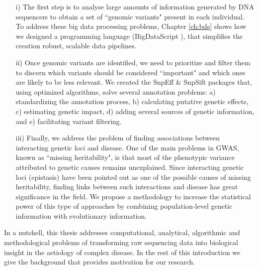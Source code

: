 \begin{itemize}

\item[i)] The first step is to analyse large amounts of information generated by DNA sequencers to obtain a set of ``genomic variants" present in each individual. 
To address these big data processing problems, Chapter \ref{ch:bds} shows how we designed a programming language (BigDataScript \cite{cingolani2015bigdatascript}), that simplifies the creation robust, scalable data pipelines.

\item[ii)] Once genomic variants are identified, we need to prioritize and filter them to discern which variants should be considered ``important" and which ones are likely to be less relevant. We created the SnpEff \& SnpSift \cite{cingolani2012program, cingolani2012using} packages that, using optimized algorithms, solve several annotation problems: a) standardizing the annotation process, b) calculating putative genetic effects, c) estimating genetic impact, d) adding several sources of genetic information, and e) facilitating variant filtering. 
					
\item[iii)] Finally, we address the problem of finding associations between interacting genetic loci and disease. One of the main problems in GWAS, known as ``missing heritability", is that most of the phenotypic variance attributed to genetic causes remains unexplained. Since interacting genetic loci (epistasis) have been pointed out as one of the possible causes of missing heritability, finding links between such interactions and disease has great significance in the field. We propose a methodology to increase the statistical power of this type of approaches by combining population-level genetic information with evolutionary information. 

\end{itemize}

In a nutshell, this thesis addresses computational, analytical, algorithmic and methodological problems of transforming raw sequencing data into biological insight in the aetiology of complex disease. In the rest of this introduction we give the background that provides motivation for our research. 

